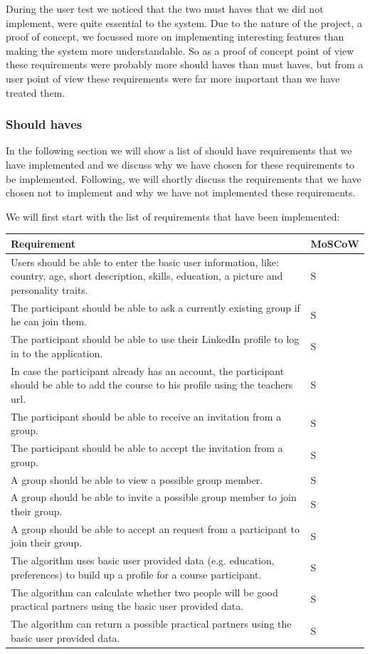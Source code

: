 During the user test we noticed that the two must haves that we did not implement, were quite essential to the system.
Due to the nature of the project, a proof of concept, we focussed more on implementing interesting features than making the system more understandable.
So as a proof of concept point of view these requirements were probably more should haves than must haves, but from a user point of view these requirements were far more important than we have treated them.


\subsubsection{Should haves}
In the following section we will show a list of should have requirements that we have implemented and we discuss why we have chosen for these requirements to be implemented.
Following, we will shortly discuss the requirements that we have chosen not to implement and why we have not implemented these requirements.

We will first start with the list of requirements that have been implemented:

\begin{tabular}{ | p{12cm} | p{2cm} | }
\hline
\textbf{Requirement} & \textbf{MoSCoW} \\ \hline
Users should be able to enter the basic user information, like: country, age, short description, skills, education, a picture and personality traits. & S \\ \hline
The participant should be able to ask a currently existing group if he can join them. & S \\ \hline
The participant should be able to use their LinkedIn profile to log in to the application. & S \\ \hline
In case the participant already has an account, the participant should be able to add the course to his profile using the teachers url. & S \\ \hline
The participant should be able to receive an invitation from a group. & S \\ \hline
The participant should be able to accept the invitation from a group. & S \\ \hline
A group should be able to view a possible group member. & S \\ \hline
A group should be able to invite a possible group member to join their group. & S \\ \hline
A group should be able to accept an request from a participant to join their group. & S \\ \hline
The algorithm uses basic user provided data (e.g. education, preferences) to build up a profile for a course participant. & S \\ \hline
The algorithm can calculate whether two people will be good practical partners using the basic user provided data. & S \\ \hline
The algorithm can return a possible practical partners using the basic user provided data. & S \\
\hline
\end{tabular}

